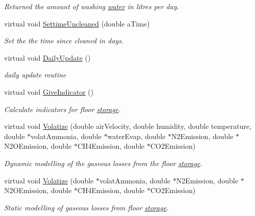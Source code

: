 \begin{DoxyCompactItemize}
\begin{DoxyCompactList}\small\item\em Returned the amount of washing \hyperlink{classwater}{water} in litres per day. \item\end{DoxyCompactList}\item 
virtual void \hyperlink{classfloorstore_a7279c61e34129cafea8b4d690b8c79b8}{SettimeUncleaned} (double aTime)
\begin{DoxyCompactList}\small\item\em Set the the time since cleaned in days. \item\end{DoxyCompactList}\item 
virtual void \hyperlink{classfloorstore_a8bb97cc7cc0551e3b726f3d8292090e9}{DailyUpdate} ()
\begin{DoxyCompactList}\small\item\em daily update routine \item\end{DoxyCompactList}\item 
virtual void \hyperlink{classfloorstore_aef2345c78fe8a0c36209d53678fba90c}{GiveIndicator} ()
\begin{DoxyCompactList}\small\item\em Calculate indicators for floor \hyperlink{classstorage}{storage}. \item\end{DoxyCompactList}\item 
virtual void \hyperlink{classfloorstore_ae328e740c794853624644db230175f0c}{Volatize} (double airVelocity, double humidity, double temperature, double $\ast$volatAmmonia, double $\ast$waterEvap, double $\ast$N2Emission, double $\ast$N2OEmission, double $\ast$CH4Emission, double $\ast$CO2Emission)
\begin{DoxyCompactList}\small\item\em Dynamic modelling of the gaseous losses from the floor \hyperlink{classstorage}{storage}. \item\end{DoxyCompactList}\item 
virtual void \hyperlink{classfloorstore_aeaade97a9f21a03bd2f5bc5acd916056}{Volatize} (double $\ast$volatAmmonia, double $\ast$N2Emission, double $\ast$N2OEmission, double $\ast$CH4Emission, double $\ast$CO2Emission)
\begin{DoxyCompactList}\small\item\em Static modelling of gaseous losses from floor \hyperlink{classstorage}{storage}. \item\end{DoxyCompactList}\item 

\end{DoxyCompactItemize}
